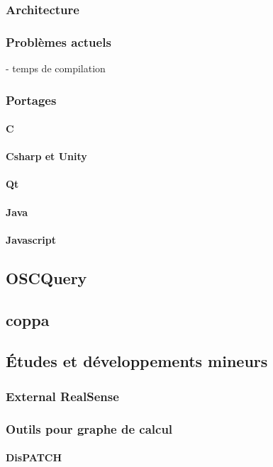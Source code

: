 \documentclass[french,a4paper]{book}
\begin{document}
\subsubsection{Architecture}
\subsubsection{Problèmes actuels}
- temps de compilation
\subsubsection{Portages}
\paragraph{C}
\paragraph{Csharp et Unity}
\paragraph{Qt}
\paragraph{Java}
\paragraph{Javascript}
\subsection{OSCQuery}
\subsection{coppa}

\subsection{Études et développements mineurs}
\subsubsection{External RealSense}
\subsubsection{Outils pour graphe de calcul}
\paragraph{DisPATCH}
\end{document}
